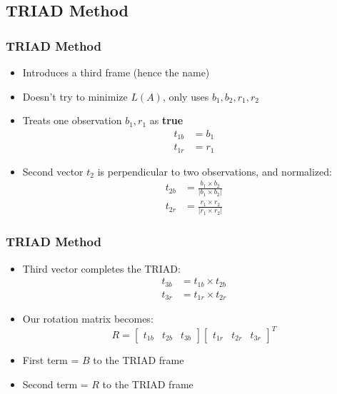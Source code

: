 \documentclass[11pt]{beamer}
\begin{document}
    \subsection{TRIAD Method}\label{subsec:triadMethod}
    \begin{frame}
        \frametitle{TRIAD Method}
        \begin{itemize}[<+->]
            \item Introduces a third frame (hence the name) \medskip
            \item Doesn't try to minimize $L(A)$, only uses $b_1, b_2, r_1, r_2$ \medskip
            \item Treats one observation $b_1, r_1$ as \textbf{true}
            \begin{align}
                t_{1b} &= b_1 \\
                t_{1r} &= r_1
            \end{align}
            \item Second vector $t_2$ is perpendicular to two observations, and normalized:
            \begin{align}
                t_{2b} &= \frac{b_1 \times b_2}{\lvert b_1 \times b_2 \rvert} \\
                t_{2r} &= \frac{r_1 \times r_2}{\lvert r_1 \times r_2 \rvert}
            \end{align}
        \end{itemize}
    \end{frame}

    \begin{frame}
        \frametitle{TRIAD Method}
        \begin{itemize}[<+->]
            \item Third vector completes the TRIAD:
            \begin{align}
                t_{3b} &= t_{1b} \times t_{2b} \\
                t_{3r} &= t_{1r} \times t_{2r}
            \end{align}
            \item Our rotation matrix becomes:
            \begin{equation}
                R =
                \begin{bmatrix}
                    t_{1b} & t_{2b} & t_{3b}
                \end{bmatrix}
                \begin{bmatrix}
                    t_{1r} & t_{2r} & t_{3r}
                \end{bmatrix}^T
            \end{equation}
            \item First term = $B$ to the TRIAD frame \medskip
            \item Second term = $R$ to the TRIAD frame
        \end{itemize}
    \end{frame}
\end{document}

